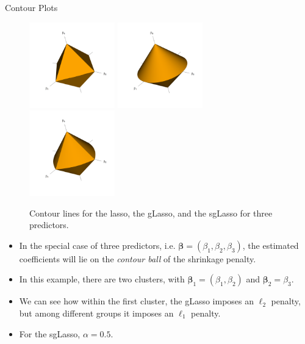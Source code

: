 \documentclass[8pt]{beamer}
\newcommand{\mydef}[1]{\textcolor{SteelBlue3}{\textit{#1}}} %
\begin{document}
\begin{frame}{Contour Plots}

\begin{figure}[ht]

\centering
\includegraphics[width = 0.33\textwidth]{3D_lasso_contour.png}
\includegraphics[width = 0.33\textwidth]{3D_glasso_contour.png}
\includegraphics[width = 0.33\textwidth]{3D_sglasso_contour.png}

\caption{Contour lines for the lasso, the gLasso, and the sgLasso for three predictors.}

\end{figure}

\begin{itemize}
    \item In the special case of three predictors, i.e. $\bm{\beta}=(\beta_1,\beta_2,\beta_3)$, the estimated coefficients will lie on the \mydef{contour ball} of the shrinkage penalty. %

    \item In this example, there are two clusters, with $\bm{\beta}_1 = (\beta_1,\beta_2)$ and $\bm{\beta}_2 = \beta_3$. 
    
    \item We can see how within the first cluster, the gLasso imposes an $\ell_2$ penalty, but among different groups it imposes an $\ell_1$ penalty.

    \item For the sgLasso, $\alpha = 0.5$.
    
\end{itemize}   
\end{frame}
\end{document}
